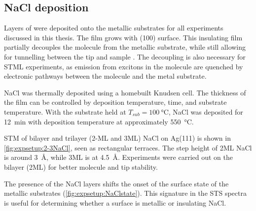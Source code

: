 \begin{figure} [h]
    \centering
    \caption{}
    \label{fig:expsetup:Au111}
\end{figure}


\subsection*{NaCl deposition}

Layers of  were deposited onto the metallic substrates for all experiments discussed in this thesis. The film grows with (100) surface. This insulating film partially decouples the molecule from the metallic substrate, while still allowing for tunnelling between the tip and sample \citep{repp2005molecules}. The decoupling is also necessary for \ac{STML} experiments, as emission from excitons in the molecule are quenched by electronic pathways between the molecule and the metal substrate.

NaCl was thermally deposited using a homebuilt Knudsen cell. The thickness of the film can be controlled by deposition temperature, time, and substrate temperature. With the substrate held at $T_{sub} = \SI{100}{\celsius}$, NaCl was deposited for \SI{12}{\minute} with deposition temperature at approximately \SI{550}{\celsius}. 

\begin{figure} [h]
    \centering
    \caption{}
    \label{fig:expsetup:2-3NaCl}
\end{figure}

\ac{STM} of bilayer and trilayer (2-\acf{ML} and 3\ac{ML}) NaCl on Ag(111) is shown in \autoref{fig:expsetup:2-3NaCl}, seen as rectangular terraces. The step height of 2\ac{ML} NaCl is around \SI{3}{\angstrom}, while 3\ac{ML} is at \SI{4.5}{\angstrom}. Experiments were carried out on the bilayer (2\ac{ML}) for better molecule and tip stability.

The presence of the NaCl layers shifts the onset of the surface state of the metallic substrates (\autoref{fig:expsetup:NaClstate}). This signature in the \ac{STS} spectra is useful for determining whether a surface is metallic or insulating NaCl.

\begin{figure} [h]
    \centering
    \caption{}
    \label{fig:expsetup:NaClstate}
\end{figure}

